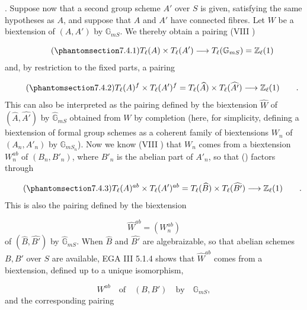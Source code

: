 
\medskip
\noindent
{}. Suppose now that a second group scheme $A'$ over $S$ is given,
satisfying the same hypotheses as $A$, and suppose that $A$ and $A'$
have connected fibres. Let $W$ be a biextension of $(A,A')$ by
$\mathbb G_{mS}$. We thereby obtain a pairing (VIII )

\begin{equation}\tag{\SGARefTarget{sga7.sga7i.eix.n7-4-1}{7.4.1}}
T_{\ell}(A) \times T_{\ell}(A') \longrightarrow
T_{\ell}(\mathbb G_{mS}) = \mathbb Z_{\ell}(1)
\end{equation}
and, by restriction to the fixed parts, a pairing

\begin{equation}\tag{\SGARefTarget{sga7.sga7i.eix.n7-4-2}{7.4.2}}
T_{\ell}(A)^{f} \times T_{\ell}(A')^{f}
 = T_{\ell}(\widehat A) \times T_{\ell}(\widehat {A'})
 \longrightarrow \mathbb Z_{\ell}(1) \qquad .
\end{equation}
This can also be interpreted as the pairing defined by the
biextension $\widehat W$ of $(\widehat A,\widehat {A'})$ by
$\widehat{\mathbb G}_{mS}$ obtained from $W$ by completion (here, for
simplicity, defining a biextension of formal group schemes as a
coherent family of biextensions $W_n$ of $(A_n,A'_n)$ by
$\mathbb G_{mS_n}$). Now we know (VIII ) that $W_n$ comes from a
biextension $W_n^{ab}$ of $(B_n,B'_n)$, where $B'_n$ is the abelian
part of $A'_n$, so that () factors through

\begin{equation}\tag{\SGARefTarget{sga7.sga7i.eix.n7-4-3}{7.4.3}}
T_{\ell}(A)^{ab} \times T_{\ell}(A')^{ab}
 = T_{\ell}(\widehat B) \times T_{\ell}(\widehat {B'})
 \longrightarrow \mathbb Z_{\ell}(1) \qquad .
\end{equation}
This is also the pairing defined by the biextension

\begin{equation*}
\widehat W^{ab}=(W_n^{ab})
\end{equation*}
of $(\widehat B,\widehat {B'})$ by $\widehat{\mathbb G}_{mS}$. When
$\widehat B$ and $\widehat {B'}$ are algebraizable, so that abelian
schemes $B,B'$ over $S$ are available, EGA III 5.1.4 shows that
$\widehat W^{ab}$ comes from a biextension, defined up to a unique
isomorphism,

\begin{equation*}
W^{ab}\quad\text{of}\quad(B,B')\quad\text{by}\quad\mathbb G_{mS},
\end{equation*}
and the corresponding pairing

